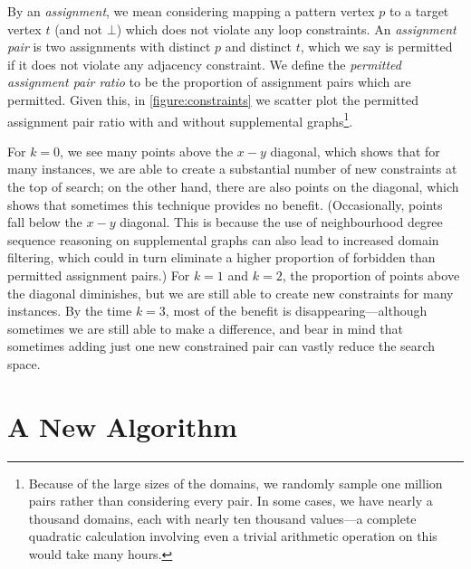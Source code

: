 \documentclass[letterpaper]{article}
\theoremstyle{definition}
\begin{document}
By an \emph{assignment}, we mean considering mapping a pattern vertex $p$ to a target vertex $t$ (and not
$\bot$) which does not violate any loop constraints. An \emph{assignment pair} is two assignments with
distinct $p$ and distinct $t$, which we say is permitted if it does not violate any adjacency
constraint. We define the \emph{permitted assignment pair ratio} to be the proportion of assignment pairs
which are permitted.  Given this, in \cref{figure:constraints} we scatter plot the permitted assignment
pair ratio with and without supplemental graphs\footnote{Because of the large sizes of the domains,
we randomly sample one million pairs rather than considering every pair. In some cases, we have
nearly a thousand domains, each with nearly ten thousand values---a complete quadratic calculation
involving even a trivial arithmetic operation on this would take many hours.}.

For $k = 0$, we see many points above the $x-y$ diagonal, which shows that for many instances, we
are able to create a substantial number of new constraints at the top of search; on the other hand,
there are also points on the diagonal, which shows that sometimes this technique provides no
benefit. (Occasionally, points fall below the $x-y$ diagonal.  This is because the use of
neighbourhood degree sequence reasoning on supplemental graphs can also lead to increased domain
filtering, which could in turn eliminate a higher proportion of forbidden than permitted assignment
pairs.) For $k = 1$ and $k = 2$, the proportion of points above the diagonal diminishes, but we are
still able to create new constraints for many instances. By the time $k = 3$, most of the benefit is
disappearing---although sometimes we are still able to make a difference, and bear in mind that
sometimes adding just one new constrained pair can vastly reduce the search space.

\section{A New Algorithm}\label{section:algorithm}
\end{document}
